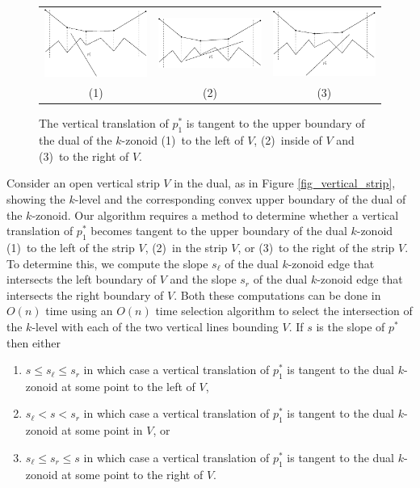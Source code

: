 \documentclass{elsart}
\begin{document}
\begin{figure}
 \begin{center}
   \begin{center}\begin{tabular}{ccc} 
   \includegraphics[width=1.68in]{fig5b} &
   \includegraphics[width=1.68in]{fig5c} & 
   \includegraphics[width=1.68in]{fig5a} \\
   (1) & (2) & (3)
   \end{tabular}\end{center}
   \caption{\label{fig_vertical_strip_abc} The vertical translation of $p_1^*$ is tangent to the
upper boundary of the dual of the $k$-zonoid (1)~to the left
of $V$, (2)~inside of $V$ and (3)~to the right of $V$.} 
 \end{center}
\end{figure}


Consider an open vertical strip $V$ in the dual, as in Figure
\ref{fig_vertical_strip}, showing the $k$-level and the corresponding
convex upper boundary of the dual of the $k$-zonoid.  Our algorithm
requires a method to determine whether a vertical translation of $p_1^*$
becomes tangent to the upper boundary of the dual $k$-zonoid  (1)~to
the left of the strip $V$, (2)~in
the strip $V$, or (3)~to the right of
the strip $V$.  To determine this, we compute the slope $s_\ell$ of
the dual $k$-zonoid edge that intersects the left boundary of $V$ and
the slope $s_r$ of the dual $k$-zonoid edge that intersects the
right boundary of $V$.  Both these computations can be done in $O(n)$
time using an $O(n)$ time selection algorithm to select the
intersection of the $k$-level with each of the two vertical lines
bounding $V$.  If $s$ is
the slope of $p^*$ then either
\begin{enumerate}
\item $s \le s_\ell \le s_r$ in which case a vertical translation of
$p_1^*$ is tangent to the dual $k$-zonoid at some point to the left of
$V$, 
\item $s_\ell < s < s_r$ in which case a vertical translation of
$p_1^*$ is tangent to the dual $k$-zonoid at some point in 
$V$, or
\item $s_\ell \le s_r \le s$ in which case a vertical translation of
$p_1^*$ is tangent to the dual $k$-zonoid at some point to the right
of $V$.
\end{enumerate}
\end{document}
